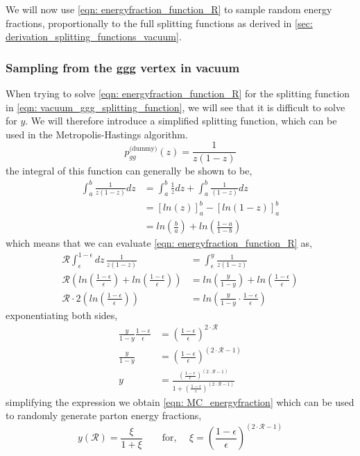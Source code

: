 \documentclass[main.tex]{subfiles}
\begin{document}
We will now use \autoref{eqn: energyfraction_function_R} to sample random energy fractions, proportionally to the full splitting functions as derived in \autoref{sec: derivation_splitting_functions_vacuum}.

\subsubsection{Sampling from the ggg vertex in vacuum}
When trying to solve \autoref{eqn: energyfraction_function_R} for the \ggg splitting function in \autoref{eqn: vacuum_ggg_splitting_function}, we will see that it is difficult to solve for \(y\). We will therefore introduce a simplified splitting function, which can be used in the Metropolis-Hastings algorithm.
\begin{equation}\label{eqn: p_ggg_vacuum_dummy}
    p^{\text{(dummy)}}_{gg}(z) = \frac{1}{z(1-z)}
\end{equation}
the integral of this function can generally be shown to be, 
\begin{align}
    \int_a^b \frac{1}{z(1-z)}dz &= \int_a^b \frac{1}{z}dz + \int_a^b \frac{1}{(1-z)}dz \nonumber\\
    &= \left[ ln (z)\right]_a^b - \left[ln(1-z) \right]_a^b  \nonumber\\
    &= ln (\frac{b}{a}) + ln(\frac{1-a}{1-b})
\end{align}
which means that we can evaluate \autoref{eqn: energyfraction_function_R} as,
\begin{align}
    \mathcal{R} \int_\epsilon^{1-\epsilon} dz \, \frac{1}{z(1-z)} &= \int_\epsilon^{y} \frac{1}{z(1-z)}  \nonumber\\
    \mathcal{R} \left(  ln (\frac{1-\epsilon}{\epsilon}) + ln(\frac{1-\epsilon}{\epsilon}) \right) &= ln (\frac{y}{1-y}) + ln(\frac{1-\epsilon}{\epsilon}) \nonumber\\
    \mathcal{R} \cdot 2 \left( ln (\frac{1-\epsilon}{\epsilon}) \right) &= ln (\frac{y}{1-y} \cdot \frac{1-\epsilon}{\epsilon})
\end{align}
exponentiating both sides, 
\begin{align}\label{eqn: MC_energyfraction_origin_vacuum}
    \frac{y}{1-y} \frac{1-\epsilon}{\epsilon} &= \left(\frac{1-\epsilon}{\epsilon}\right)^{2\cdot \mathcal{R}} \nonumber\\
    \frac{y}{1-y} &= \left(\frac{1-\epsilon}{\epsilon}\right)^{(2\cdot \mathcal{R}-1)} \nonumber\\
    y &= \frac{\left(\frac{1-\epsilon}{\epsilon}\right)^{(2\cdot \mathcal{R}-1)}}{1+\left(\frac{1-\epsilon}{\epsilon}\right)^{(2\cdot \mathcal{R}-1)}}
\end{align}
simplifying the expression we obtain \autoref{eqn: MC_energyfraction} which can be used to randomly generate parton energy fractions, 
\begin{equation}\label{eqn: MC_energyfraction}
    y(\mathcal{R}) = \frac{\xi}{1+ \xi} \qquad \text{for, } \quad \xi = \left(\frac{1-\epsilon}{\epsilon}\right)^{(2\cdot \mathcal{R}-1)}
\end{equation}
\end{document}
